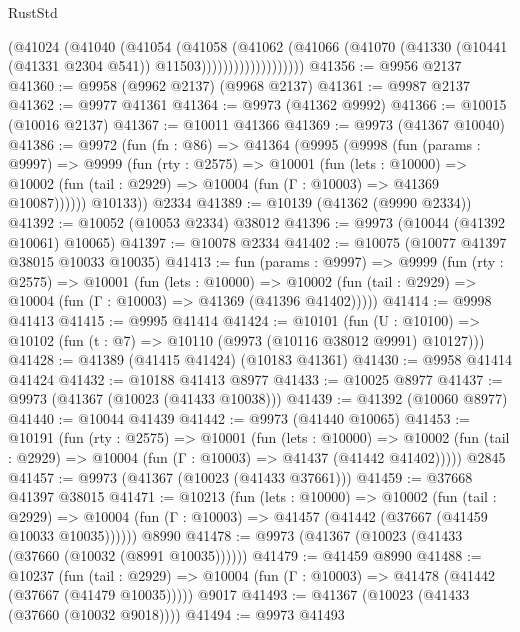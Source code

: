 \begin{lexlean}{RustStd}
\begin{coremodule}
                          (@41024
                            (@41040
                              (@41054
                                (@41058
                                  (@41062
                                    (@41066
                                      (@41070
                                        (@41330
                                          (@10441 (@41331 @2304 @541))
                                          @11503)))))))))))))))))))
@41356 := @9956 @2137
@41360 := @9958 (@9962 @2137) (@9968 @2137)
@41361 := @9987 @2137
@41362 := @9977 @41361
@41364 := @9973 (@41362 @9992)
@41366 := @10015 (@10016 @2137)
@41367 := @10011 @41366
@41369 := @9973 (@41367 @10040)
@41386 := @9972
    (fun (fn : @86) =>
    @41364
      (@9995
        (@9998
          (fun (params : @9997) =>
          @9999
            (fun (rty : @2575) =>
            @10001
              (fun (lets : @10000) =>
              @10002 (fun (tail : @2929) => @10004 (fun (Γ : @10003) => @41369 @10087))))))
        @10133))
    @2334
@41389 := @10139 (@41362 (@9990 @2334))
@41392 := @10052 (@10053 @2334) @38012
@41396 := @9973 (@10044 (@41392 @10061) @10065)
@41397 := @10078 @2334
@41402 := @10075 (@10077 @41397 @38015 @10033 @10035)
@41413 := fun (params : @9997) =>
  @9999
    (fun (rty : @2575) =>
    @10001
      (fun (lets : @10000) =>
      @10002 (fun (tail : @2929) => @10004 (fun (Γ : @10003) => @41369 (@41396 @41402)))))
@41414 := @9998 @41413
@41415 := @9995 @41414
@41424 := @10101
    (fun (U : @10100) => @10102 (fun (t : @7) => @10110 (@9973 (@10116 @38012 @9991) @10127)))
@41428 := @41389 (@41415 @41424) (@10183 @41361)
@41430 := @9958 @41414 @41424
@41432 := @10188 @41413 @8977
@41433 := @10025 @8977
@41437 := @9973 (@41367 (@10023 (@41433 @10038)))
@41439 := @41392 (@10060 @8977)
@41440 := @10044 @41439
@41442 := @9973 (@41440 @10065)
@41453 := @10191
    (fun (rty : @2575) =>
    @10001
      (fun (lets : @10000) =>
      @10002 (fun (tail : @2929) => @10004 (fun (Γ : @10003) => @41437 (@41442 @41402)))))
    @2845
@41457 := @9973 (@41367 (@10023 (@41433 @37661)))
@41459 := @37668 @41397 @38015
@41471 := @10213
    (fun (lets : @10000) =>
    @10002
      (fun (tail : @2929) =>
      @10004 (fun (Γ : @10003) => @41457 (@41442 (@37667 (@41459 @10033 @10035))))))
    @8990
@41478 := @9973 (@41367 (@10023 (@41433 (@37660 (@10032 (@8991 @10035))))))
@41479 := @41459 @8990
@41488 := @10237
    (fun (tail : @2929) => @10004 (fun (Γ : @10003) => @41478 (@41442 (@37667 (@41479 @10035)))))
    @9017
@41493 := @41367 (@10023 (@41433 (@37660 (@10032 @9018))))
@41494 := @9973 @41493

\end{coremodule}
\end{lexlean}
